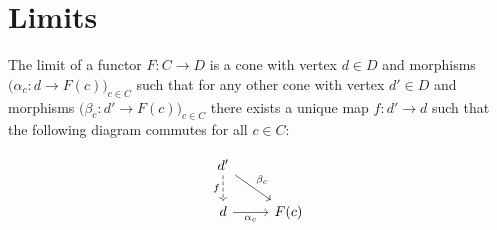 \section{Limits}

\begin{definition}
	The limit of a functor $F:C\to D$ is a cone with vertex $d\in D$ and morphisms
	$\big(\alpha_c: d \to F(c)\big)_{c\in C}$ such that for any other cone with
	vertex $d'\in D$ and morphisms $\big(\beta_c: d' \to F(c)\big)_{c\in C}$ there
	exists a unique map $f:d'\to d$ such that the following diagram commutes for
	all $c\in C$: \parencite{leinster:basic_category_theory}

	\[\begin{tikzcd}
		{d'} \\
		d & {F(c)}
		\arrow["{\alpha_c}"', from=2-1, to=2-2]
		\arrow["{\beta_c}", from=1-1, to=2-2]
		\arrow["f"', dashed, from=1-1, to=2-1]
	\end{tikzcd}\]
\end{definition}


